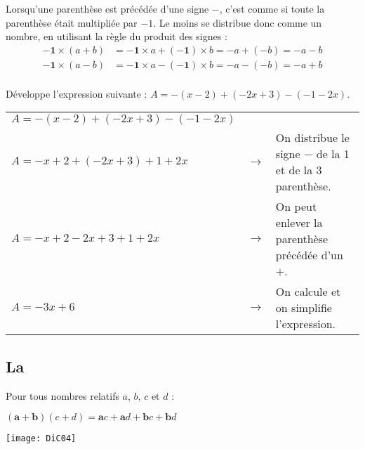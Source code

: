 \begin{propriete}
Lorsqu'une parenthèse est précédée d'une signe $-$, c'est comme si toute la parenthèse était multipliée par $-1$. Le moins se distribue donc comme un nombre, en utilisant la règle du produit des signes :
\begin{align*}
    \boldsymbol{-1 \times} (a + b) &= \boldsymbol{-1 \times} a + \boldsymbol{( -1 ) \times} b = - a + (-b) = - a - b \\
    \boldsymbol{-1 \times} (a - b) &= \boldsymbol{-1 \times} a - \boldsymbol{( -1 ) \times} b = - a - (-b) = - a + b \\
\end{align*}

\end{propriete}

\begin{exemple*1}

Développe l'expression suivante : $A = - (x - 2) + (- 2x + 3) - (-1 - 2x)$.

\correction

\begin{tabular}{lcl}
$A = - (x - 2) + (- 2x + 3) - (-1 - 2x)$ & & \\
$A =  - x + 2 + (- 2x + 3) +1 + 2x$ & $\longrightarrow$ & On distribue le signe $-$ de la 1\up{ère} et de la 3\up{e} parenthèse. \\
$A = - x + 2 - 2x + 3 +1 + 2x$ & $\longrightarrow$ & On peut enlever la parenthèse précédée d'un $+$. \\
$A = - 3x + 6$ & $\longrightarrow$ & On calcule et on simplifie l'expression. \\
\end{tabular}
\end{exemple*1}





\subsection{La }


\begin{propriete}
Pour tous nombres relatifs $a$, $b$, $c$ et $d$ :

\begin{minipage}[c]{.6\linewidth}
    \centering
    $(\boldsymbol{a} + \boldsymbol{b})(c + d) = \boldsymbol{a}c + \boldsymbol{a}d + \boldsymbol{b}c + \boldsymbol{b}d$
\end{minipage}%
\hfill%
\begin{minipage}[c]{.38\linewidth}
    \centering
    \texttt{[image: DiC04]}
\end{minipage}
\end{propriete} 

